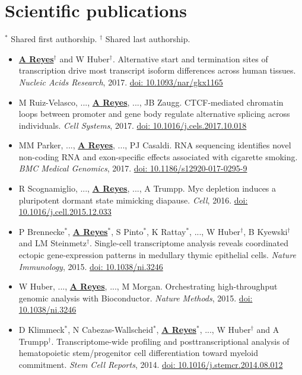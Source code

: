 \documentclass[11pt,a4paper,sans]{moderncv} %
\begin{document}
\section{Scientific publications}
\vspace{-.1cm}
\footnotesize{$^{\ast}$ Shared first authorship.} \hspace{.5cm}
\footnotesize{$^{\dagger}$ Shared last authorship.}
\vspace{.1cm}
\begin{itemize}
\item \textbf{\underline{A Reyes}}$^{\dagger}$ and W Huber$^{\dagger}$. Alternative start and termination sites of transcription drive most transcript isoform differences across human tissues. \textit{Nucleic Acids Research}, 2017. \href{https://doi.org/10.1093/nar/gkx1165}{doi: 10.1093/nar/gkx1165}
\item M Ruiz-Velasco, ..., \textbf{\underline{A Reyes}}, ..., JB Zaugg. CTCF-mediated chromatin loops between promoter and gene body regulate alternative splicing across individuals. \textit{Cell Systems}, 2017. \href{http://dx.doi.org/10.1016/j.cels.2017.10.018}{doi: 10.1016/j.cels.2017.10.018}
\item MM Parker, ..., \textbf{\underline{A Reyes}}, ..., PJ Casaldi. RNA sequencing identifies novel non-coding RNA and exon-specific effects associated with cigarette smoking. \textit{BMC Medical Genomics}, 2017. \href{https://doi.org/10.1186/s12920-017-0295-9}{doi: 10.1186/s12920-017-0295-9}
\item R Scognamiglio, ..., \textbf{\underline{A Reyes}}, ..., A Trumpp. Myc depletion induces a pluripotent dormant state mimicking diapause. \textit{Cell}, 2016. \href{https://doi.org/10.1016/j.cell.2015.12.033}{doi: 10.1016/j.cell.2015.12.033}
\item P Brennecke$^{\ast}$, \textbf{\underline{A Reyes}}$^{\ast}$, S Pinto$^{\ast}$, K Rattay$^{\ast}$, ..., W Huber$^{\dagger}$, B Kyewski$^{\dagger}$ and LM Steinmetz$^{\dagger}$. Single-cell transcriptome analysis reveals coordinated ectopic gene-expression patterns in medullary thymic epithelial cells. \textit{Nature Immunology}, 2015. \href{https://doi.org/10.1038/ni.3246}{doi: 10.1038/ni.3246}
\item W Huber, ..., \textbf{\underline{A Reyes}}, ..., M Morgan. Orchestrating high-throughput genomic analysis with Bioconductor. \textit{Nature Methods}, 2015. \href{https://doi.org/10.1038/ni.3246}{doi: 10.1038/ni.3246}
\item D Klimmeck$^{\ast}$, N Cabezas-Wallscheid$^{\ast}$, \textbf{\underline{A Reyes}}$^{\ast}$, ..., W Huber$^{\dagger}$ and A Trumpp$^{\dagger}$. Transcriptome-wide profiling and posttranscriptional analysis of hematopoietic stem/progenitor cell differentiation toward myeloid commitment. \textit{Stem Cell Reports}, 2014. \href{https://doi.org/10.1016/j.stemcr.2014.08.012}{doi: 10.1016/j.stemcr.2014.08.012}

\end{itemize}
\end{document}
